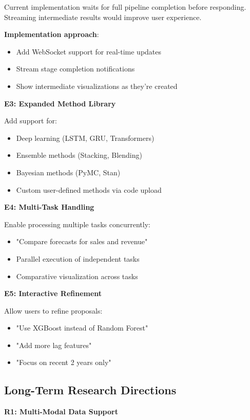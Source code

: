 \documentclass[11pt,a4paper]{article}
\begin{document}
Current implementation waits for full pipeline completion before responding. Streaming intermediate results would improve user experience.

\textbf{Implementation approach}:
\begin{itemize}
    \item Add WebSocket support for real-time updates
    \item Stream stage completion notifications
    \item Show intermediate visualizations as they're created
\end{itemize}

\textbf{E3: Expanded Method Library}

Add support for:
\begin{itemize}
    \item Deep learning (LSTM, GRU, Transformers)
    \item Ensemble methods (Stacking, Blending)
    \item Bayesian methods (PyMC, Stan)
    \item Custom user-defined methods via code upload
\end{itemize}

\textbf{E4: Multi-Task Handling}

Enable processing multiple tasks concurrently:
\begin{itemize}
    \item "Compare forecasts for sales and revenue"
    \item Parallel execution of independent tasks
    \item Comparative visualization across tasks
\end{itemize}

\textbf{E5: Interactive Refinement}

Allow users to refine proposals:
\begin{itemize}
    \item "Use XGBoost instead of Random Forest"
    \item "Add more lag features"
    \item "Focus on recent 2 years only"
\end{itemize}

\subsection{Long-Term Research Directions}

\textbf{R1: Multi-Modal Data Support}
\end{document}
